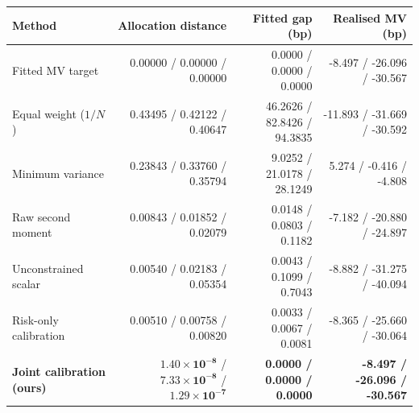 \begin{tabular}{@{}lrrr@{}}\toprule
Method & Allocation distance & Fitted gap (bp) & Realised MV (bp)\\\midrule
Fitted MV target & 0.00000 / 0.00000 / 0.00000 & 0.0000 / 0.0000 / 0.0000 & -8.497 / -26.096 / -30.567 \\
Equal weight ($1/N$) & 0.43495 / 0.42122 / 0.40647 & 46.2626 / 82.8426 / 94.3835 & -11.893 / -31.669 / -30.592 \\
Minimum variance & 0.23843 / 0.33760 / 0.35794 & 9.0252 / 21.0178 / 28.1249 & 5.274 / -0.416 / -4.808 \\
Raw second moment & 0.00843 / 0.01852 / 0.02079 & 0.0148 / 0.0803 / 0.1182 & -7.182 / -20.880 / -24.897 \\
Unconstrained scalar & 0.00540 / 0.02183 / 0.05354 & 0.0043 / 0.1099 / 0.7043 & -8.882 / -31.275 / -40.094 \\
Risk-only calibration & 0.00510 / 0.00758 / 0.00820 & 0.0033 / 0.0067 / 0.0081 & -8.365 / -25.660 / -30.064 \\
\midrule
\textbf{Joint calibration (ours)} & $\mathbf{1.40\times10^{-8}}$ / $\mathbf{7.33\times10^{-8}}$ / $\mathbf{1.29\times10^{-7}}$ & \textbf{0.0000 / 0.0000 / 0.0000} & \textbf{-8.497 / -26.096 / -30.567} \\
\bottomrule\end{tabular}
